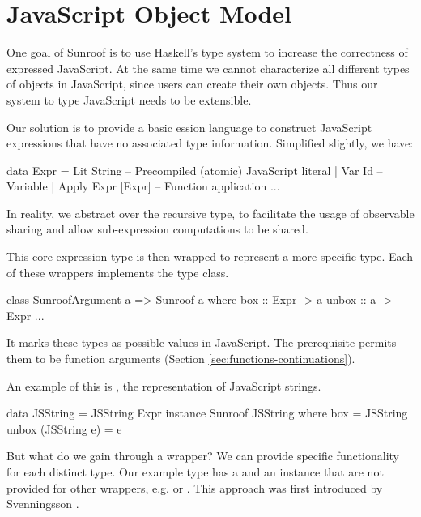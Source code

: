  
\section{JavaScript Object Model}
\label{sec:object-model}

One goal of Sunroof is to use Haskell's type system to
increase the correctness of expressed JavaScript.
At the same time we cannot characterize 
all different types of objects in JavaScript, since 
users can create their own objects. Thus our 
system to type JavaScript needs to be extensible.

Our solution is to provide a basic ession
language to construct JavaScript expressions 
that have no associated type information. Simplified slightly, we have:
\begin{Code}
data Expr 
  = Lit String        -- Precompiled (atomic) JavaScript literal
  | Var Id            -- Variable
  | Apply Expr [Expr] -- Function application
  ...
\end{Code}
In reality, we abstract  over the recursive type,
to facilitate the usage of observable sharing \cite{Gill:09:TypeSafeReification}
and allow sub-expression computations to be shared.

This core expression type 
is then wrapped to represent a more specific type. 
Each of these wrappers implements the  type class.
\begin{Code}
class SunroofArgument a => Sunroof a where
  box   :: Expr -> a
  unbox :: a -> Expr
  ...
\end{Code}
It marks these types as possible values in JavaScript.
The  prerequisite permits them 
to be function arguments (Section \ref{sec:functions-continuations}).

An example of this is , the representation
of JavaScript strings.
\begin{Code}
data JSString = JSString Expr
instance Sunroof JSString where
  box                = JSString
  unbox (JSString e) = e
\end{Code}
But what do we gain through a wrapper? We can
provide specific functionality for each distinct type.
Our example type  has a  and an 
 instance that are not provided for other 
wrappers, e.g.  or .
This approach was first introduced by 
Svenningsson \cite{Svenningsson:12:CombiningEmbedding}.

